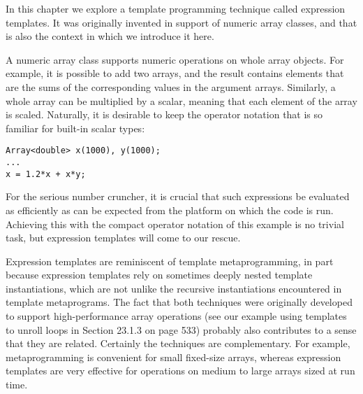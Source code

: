 In this chapter we explore a template programming technique called expression templates. It was originally invented in support of numeric array classes, and that is also the context in which we introduce it here.

A numeric array class supports numeric operations on whole array objects. For example, it is possible to add two arrays, and the result contains elements that are the sums of the corresponding values in the argument arrays. Similarly, a whole array can be multiplied by a scalar, meaning that each element of the array is scaled. Naturally, it is desirable to keep the operator notation that is so familiar for built-in scalar types:

\begin{lstlisting}[style=styleCXX]
Array<double> x(1000), y(1000);
...
x = 1.2*x + x*y;
\end{lstlisting}

For the serious number cruncher, it is crucial that such expressions be evaluated as efficiently as can be expected from the platform on which the code is run. Achieving this with the compact operator notation of this example is no trivial task, but expression templates will come to our rescue.

Expression templates are reminiscent of template metaprogramming, in part because expression templates rely on sometimes deeply nested template instantiations, which are not unlike the recursive instantiations encountered in template metaprograms. The fact that both techniques were originally developed to support high-performance array operations (see our example using templates to unroll loops in Section 23.1.3 on page 533) probably also contributes to a sense that they are related. Certainly the techniques are complementary. For example, metaprogramming is convenient for small fixed-size arrays, whereas expression templates are very effective for operations on medium to large arrays sized at run time.









































